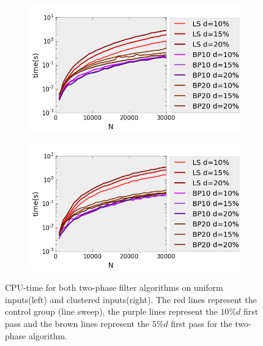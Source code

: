 \begin{figure}[H] 
  \begin{subfigure}[b]{0.5\linewidth}
    \centering
    \includegraphics[width=0.9\linewidth]{Pictures/unif_ls_bp_t} 
    \label{fig:unif_ls_bp_t} 
    \vspace{4ex}
  \end{subfigure}%
  \begin{subfigure}[b]{0.5\linewidth}
    \centering
    \includegraphics[width=0.9\linewidth]{Pictures/clus_ls_bp_t} 
    \label{fig:clus_ls_bp_t} 
    \vspace{4ex}
  \end{subfigure}
  \caption[CPU-time for both two-phase filter algorithms on uniform and clustered inputs]{CPU-time for both two-phase filter algorithms on uniform inputs(left) and clustered inputs(right). The red lines represent the control group (line sweep), the purple lines represent the $10\%d$ first pass and the brown lines represent the $5\%d$ first pass for the two-phase algorithm.}
  \label{fig:ls_bp_t} 
\end{figure}

